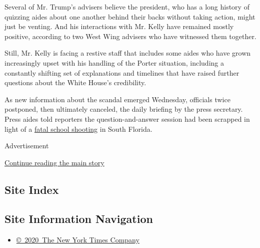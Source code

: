 Several of Mr. Trump's advisers believe the president, who has a long
history of quizzing aides about one another behind their backs without
taking action, might just be venting. And his interactions with Mr.
Kelly have remained mostly positive, according to two West Wing advisers
who have witnessed them together.

Still, Mr. Kelly is facing a restive staff that includes some aides who
have grown increasingly upset with his handling of the Porter situation,
including a constantly shifting set of explanations and timelines that
have raised further questions about the White House's credibility.

As new information about the scandal emerged Wednesday, officials twice
postponed, then ultimately canceled, the daily briefing by the press
secretary. Press aides told reporters the question-and-answer session
had been scrapped in light of a
\href{https://www.nytimes3xbfgragh.onion/2018/02/14/us/parkland-school-shooting.html?hp\&action=click\&pgtype=Homepage\&clickSource=story-heading\&module=span-ab-top-region\&region=top-news\&WT.nav=top-news}{fatal
school shooting} in South Florida.

Advertisement

\protect\hyperlink{after-bottom}{Continue reading the main story}

\hypertarget{site-index}{%
\subsection{Site Index}\label{site-index}}

\hypertarget{site-information-navigation}{%
\subsection{Site Information
Navigation}\label{site-information-navigation}}

\begin{itemize}
\tightlist
\item
  \href{https://help.nytimes3xbfgragh.onion/hc/en-us/articles/115014792127-Copyright-notice}{©~2020~The
  New York Times Company}
\end{itemize}

